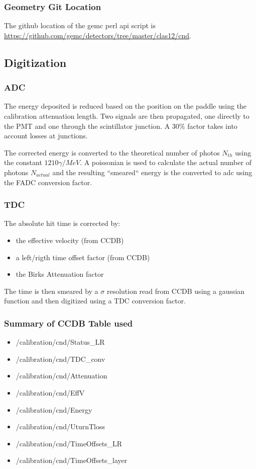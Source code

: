 \subsubsection{Geometry Git Location}
The github location of the gemc perl api script is \url{https://github.com/gemc/detectors/tree/master/clas12/cnd}.


\subsection{Digitization}

\subsubsection{ADC}

The energy deposited is reduced based on the position on the paddle using the calibration attenuation length. Two signals are then propagated, one directly
to the PMT and one through the scintillator junction. A $30\%$ factor takes into account losses at junctions.

The corrected energy is converted to the theoretical number of photos $N_{th}$ using the constant $1210 \gamma / MeV $. A poissonian is used to
calculate the actual number of photons $N_{actual}$ and the resulting ``smeared`` energy is the converted to adc using the FADC conversion factor.

\subsubsection{TDC}

The absolute hit time is corrected by:

\begin{itemize}
	\item the effective velocity (from CCDB)
	\item a left/rigth time offset factor (from CCDB)
	\item the Birks Attenuation factor
\end{itemize}

The time is then smeared by a $\sigma$ resolution read from CCDB using a gaussian function and then digitized using a TDC conversion factor.


\subsubsection{Summary of CCDB Table used}
\begin{itemize}
	\item /calibration/cnd/Status\_LR
	\item /calibration/cnd/TDC\_conv
	\item /calibration/cnd/Attenuation
	\item /calibration/cnd/EffV
	\item /calibration/cnd/Energy
	\item /calibration/cnd/UturnTloss
	\item /calibration/cnd/TimeOffsets\_LR
	\item /calibration/cnd/TimeOffsets\_layer
\end{itemize}



